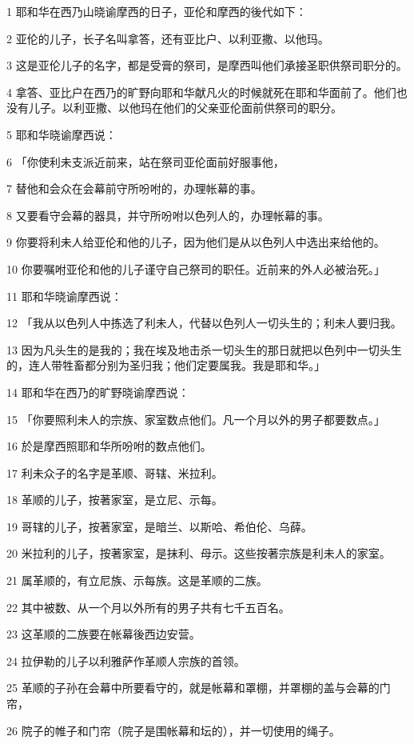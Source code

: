 \par 1 耶和华在西乃山晓谕摩西的日子，亚伦和摩西的後代如下：
\par 2 亚伦的儿子，长子名叫拿答，还有亚比户、以利亚撒、以他玛。
\par 3 这是亚伦儿子的名字，都是受膏的祭司，是摩西叫他们承接圣职供祭司职分的。
\par 4 拿答、亚比户在西乃的旷野向耶和华献凡火的时候就死在耶和华面前了。他们也没有儿子。以利亚撒、以他玛在他们的父亲亚伦面前供祭司的职分。
\par 5 耶和华晓谕摩西说：
\par 6 「你使利未支派近前来，站在祭司亚伦面前好服事他，
\par 7 替他和会众在会幕前守所吩咐的，办理帐幕的事。
\par 8 又要看守会幕的器具，并守所吩咐以色列人的，办理帐幕的事。
\par 9 你要将利未人给亚伦和他的儿子，因为他们是从以色列人中选出来给他的。
\par 10 你要嘱咐亚伦和他的儿子谨守自己祭司的职任。近前来的外人必被治死。」
\par 11 耶和华晓谕摩西说：
\par 12 「我从以色列人中拣选了利未人，代替以色列人一切头生的；利未人要归我。
\par 13 因为凡头生的是我的；我在埃及地击杀一切头生的那日就把以色列中一切头生的，连人带牲畜都分别为圣归我；他们定要属我。我是耶和华。」
\par 14 耶和华在西乃的旷野晓谕摩西说：
\par 15 「你要照利未人的宗族、家室数点他们。凡一个月以外的男子都要数点。」
\par 16 於是摩西照耶和华所吩咐的数点他们。
\par 17 利未众子的名字是革顺、哥辖、米拉利。
\par 18 革顺的儿子，按著家室，是立尼、示每。
\par 19 哥辖的儿子，按著家室，是暗兰、以斯哈、希伯伦、乌薛。
\par 20 米拉利的儿子，按著家室，是抹利、母示。这些按著宗族是利未人的家室。
\par 21 属革顺的，有立尼族、示每族。这是革顺的二族。
\par 22 其中被数、从一个月以外所有的男子共有七千五百名。
\par 23 这革顺的二族要在帐幕後西边安营。
\par 24 拉伊勒的儿子以利雅萨作革顺人宗族的首领。
\par 25 革顺的子孙在会幕中所要看守的，就是帐幕和罩棚，并罩棚的盖与会幕的门帘，
\par 26 院子的帷子和门帘（院子是围帐幕和坛的），并一切使用的绳子。
